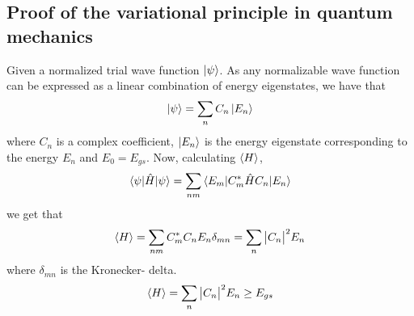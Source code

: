 \documentclass[10pt,a4paper]{article}
\begin{document}
\subsection{Proof of the variational principle in quantum mechanics}\label{Proof_variational_principle}
Given a normalized trial wave function $\ket{\psi}$. As any normalizable wave function can be expressed as a linear combination of energy eigenstates, we have that
$$
\ket{\psi} = \sum\limits_n C_n \ket{E_n}
$$
where $C_n$ is a complex coefficient, $\ket{E_n}$ is the energy eigenstate corresponding to the energy $E_n$ and $E_0=E_{gs}$. Now, calculating $\braket{H}$, 
$$
\braket{\psi|\hat{H}|\psi} = \sum\limits_{nm} \braket{E_m|C_m^*\hat{H}C_n|E_n}
$$
we get that 
$$
\braket{H}= \sum\limits_{nm} C_m^*C_n E_n \delta_{mn} =\sum\limits_{n} \big|  C_n \big|^2E_n
$$
where $\delta_{mn}$ is the Kronecker- delta.
\begin{equation}
\braket{H}=\sum\limits_{n} \big|  C_n \big|^2E_n \geq E_{gs}
\end{equation}
\end{document}
